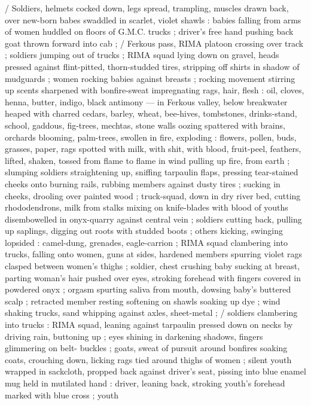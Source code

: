 
/ Soldiers, helmets cocked down, legs spread, trampling, muscles
drawn back, over new-born babes swaddled in scarlet, violet shawls
: babies falling from arms of women huddled on floors of G.M.C.
trucks ; driver's free hand pushing back goat thrown forward into cab
; / Ferkous pass, RIMA platoon crossing over track ; soldiers jumping
out of trucks ; RIMA squad lying down on gravel, heads pressed
against flint-pitted, thorn-studded tires, stripping off shirts in
shadow of mudguards ; women rocking babies against breasts ;
rocking movement stirring up scents sharpened with bonfire-sweat
impregnating rags, hair, flesh : oil, cloves, henna, butter, indigo,
black antimony — in Ferkous valley, below breakwater heaped with
charred cedars, barley, wheat, bee-hives, tombstones, drinks-stand,
school, gaddous, fig-trees, mechtas, stone walls oozing spattered
with brains, orchards blooming, palm-trees, swollen in fire, exploding
: flowers, pollen, buds, grasses, paper, rags spotted with milk, with
shit, with blood, fruit-peel, feathers, lifted, shaken, tossed from
flame to flame in wind pulling up fire, from earth ; slumping soldiers
straightening up, sniffing tarpaulin flaps, pressing tear-stained
cheeks onto burning rails, rubbing members against dusty tires ;
sucking in cheeks, drooling over painted wood ; truck-squad, down
in dry river bed, cutting rhododendrons, milk from stalks mixing on
knife-blades with blood of youths disembowelled in onyx-quarry
against central vein ; soldiers cutting back, pulling up saplings,
digging out roots with studded boots ; others kicking, swinging
lopsided : camel-dung, grenades, eagle-carrion ; RIMA squad
clambering into trucks, falling onto women, guns at sides, hardened
members spurring violet rags clasped between women's thighs ; %
soldier, chest crushing baby sucking at breast, parting woman's hair
pushed over eyes, stroking forehead with fingers covered in
powdered onyx ; orgasm spurting saliva from mouth, dowsing baby's
buttered scalp ; retracted member resting softening on shawls
soaking up dye ; wind shaking trucks, sand whipping against axles,
sheet-metal ; / soldiers clambering into trucks : RIMA squad, leaning
against tarpaulin pressed down on necks by driving rain, buttoning
up ; eyes shining in darkening shadows, fingers glimmering on belt-
buckles ; goats, sweat of pursuit around bonfires soaking coats,
crouching down, licking rags tied around thighs of women ; silent
youth wrapped in sackcloth, propped back against driver's seat,
pissing into blue enamel mug held in mutilated hand : driver, leaning
back, stroking youth's forehead marked with blue cross ; youth
